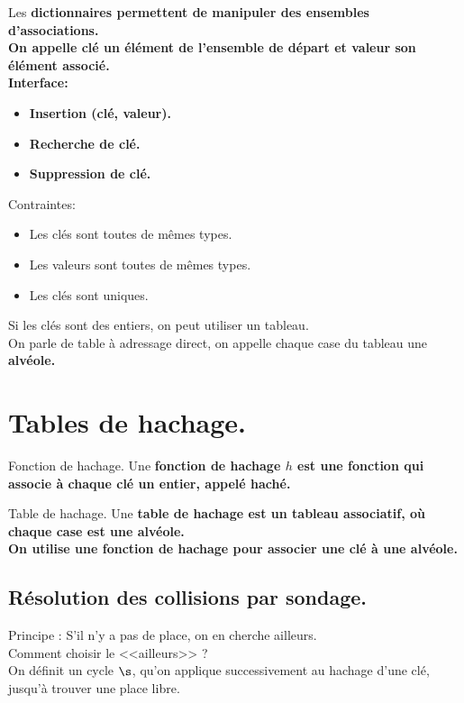 \documentclass[french, 11pt]{article}
\begin{document}
\begin{defi}{}{}
    Les \bf{dictionnaires} permettent de manipuler des ensembles d'associations.\\
    On appelle \bf{clé} un élément de l'ensemble de départ et \bf{valeur} son élément associé.\\
    Interface:
    \begin{itemize}[topsep=0pt,itemsep=-0.9 ex]
        \item \bf{Insertion} (clé, valeur).
        \item \bf{Recherche} de clé.
        \item \bf{Suppression} de clé.
    \end{itemize}
    Contraintes:
    \begin{itemize}[topsep=0pt,itemsep=-0.9 ex]
        \item Les clés sont toutes de mêmes types.
        \item Les valeurs sont toutes de mêmes types.
        \item Les clés sont uniques.
    \end{itemize}
    Si les clés sont des entiers, on peut utiliser un tableau.\\
    On parle de table à adressage direct, on appelle chaque case du tableau une \bf{alvéole}.
\end{defi}


\section{Tables de hachage.}

\begin{defi}{Fonction de hachage.}{}
    Une \bf{fonction de hachage} $h$ est une fonction qui associe à chaque clé un entier, appelé \bf{haché}.
\end{defi}

\begin{defi}{Table de hachage.}{}
    Une \bf{table de hachage} est un tableau associatif, où chaque case est une alvéole.\\
    On utilise une fonction de hachage pour associer une clé à une alvéole.
\end{defi}

\subsection{Résolution des collisions par sondage.}

\begin{defi}{}{}
    Principe : S'il n'y a pas de place, on en cherche ailleurs.\\
    Comment choisir le <<ailleurs>> ?\\
    On définit un cycle $\s$, qu'on applique successivement au hachage d'une clé, jusqu'à trouver une place libre.
\end{defi}
\end{document}
